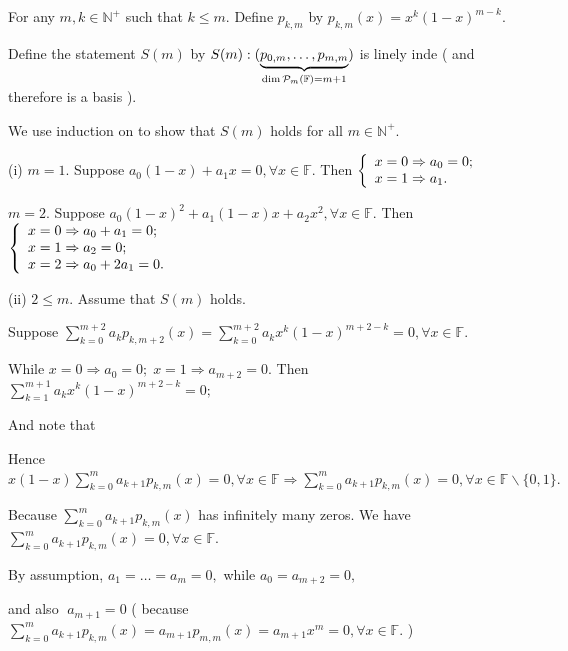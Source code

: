 \documentclass[a4paper, 11pt, UTF8]{article}
\def\Fbb{{\mathbb{F}}}
\def\Nbp{{\mathbb{N}^+}}
\def\Endi{\hspace{-2.5pt}}
\def\Hi{\quad\hspace{6.5pt}}
\def\Hii{\quad\hspace{7pt}}
\begin{document}
\begin{large}
For any $m,k\in\Nbp$ such that $k\leq m.$ Define $p_{k,m}$ by $p_{k,m}(x)=x^k(1-x)^{m-k}.$\par\quad
Define the statement $S(m)$ by $S(m):(\underbrace{p_{0,m},\dots,p_{m,m}}_{\dim\PoF{m}=m+1})$ is linely inde ( and therefore is a basis ).\vspace{4pt}\par\quad
We use induction on to show that $S(m)$ holds for all $m\in\Nbp.$\par\quad
(i) $m=1.$ Suppose $a_0(1-x)+a_1x=0,\forall x\in\Fbb.$ Then $\MathLeftBrace{l}{x=0\Rightarrow a_0=0;\\x=1\Rightarrow a_1.}$\par\quad\Hi
$m=2.$ Suppose $a_0(1-x)^2+a_1(1-x)x+a_2x^2,\forall x\in\Fbb.$ Then $\MathLeftBrace{l}{x=0\Rightarrow a_0+a_1=0;\\x=1\Rightarrow a_2=0;\\x=2\Rightarrow a_0+2a_1=0.}$\par\vspace{6pt}\quad\Endi
(ii) $2\leq m.$ Assume that $S(m)$ holds.\par\quad\Hii
Suppose $\sum\limits_{k=0}^{m+2}a_kp_{k,m+2}(x)=\sum\limits_{k=0}^{m+2}a_kx^k(1-x)^{m+2-k}=0,\forall x\in\Fbb.$\par\quad\Hii
While $x=0\Rightarrow a_0=0;\;x=1\Rightarrow a_{m+2}=0.$ Then $\sum\limits_{k=1}^{m+1}a_kx^k(1-x)^{m+2-k}=0;$\vspace{12pt}\par\quad\Hii
And note that \vspace{-12pt}\vspace{10pt}\par\quad\Hii
Hence $x(1-x)\sum_{k=0}^{m}a_{k+1}p_{k,m}(x)=0,\forall x\in\Fbb\Rightarrow \sum_{k=0}^{m}a_{k+1}p_{k,m}(x)=0,\forall x\in\Fbb\backslash\{0,1\}.$\par\quad\Hii
Because $\sum_{k=0}^{m}a_{k+1}p_{k,m}(x)$ has infinitely many zeros. We have $\sum_{k=0}^{m}a_{k+1}p_{k,m}(x)=0,\forall x\in\Fbb.$\par\quad\Hii
By assumption, $a_1=\dots=a_m=0,$ while $a_0=a_{m+2}=0,$\par\quad\Hii
\hspace{34pt}and also $\;a_{m+1}=0$ ( because $\sum_{k=0}^{m}a_{k+1}p_{k,m}(x)=a_{m+1}p_{m,m}(x)=a_{m+1}x^m=0,\forall x\in\Fbb.$ )\par\quad\Hii

\end{large}
\end{document}
